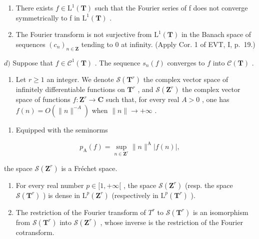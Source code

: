 \begin{enumerate}
\def\labelenumi{\alph{enumi})}
\setcounter{enumi}{1}
\item
  There exists \(f \in \mathrm{L}^{1}(\mathbf{T})\) such that the Fourier series of f does not converge symmetrically to f in \(\mathrm{L}^{1}(\mathbf{T})\) .
\item
  The Fourier transform is not surjective from \(\mathrm{L}^{1}(\mathbf{T})\) in the Banach space of sequences \((c_{n})_{n\in\mathbf{Z}}\) tending to 0 at infinity. (Apply Cor. 1 of EVT, I, p.~19.)
\end{enumerate}

\(d)\) Suppose that \(f \in \mathcal{C}^1(\mathbf{T})\) . The sequence \(s_n(f)\) converges to \(f\) into \(\mathcal{C}(\mathbf{T})\) .

\begin{enumerate}
\def\labelenumi{\arabic{enumi})}
\setcounter{enumi}{30}
\tightlist
\item
  Let \(r \geqslant 1\) an integer. We denote \(\mathcal{S}(\mathbf{T}^r)\) the complex vector space of infinitely differentiable functions on \(\mathbf{T}^r\) , and \(\mathcal{S}(\mathbf{Z}^r)\) the complex vector space of functions \(f\colon \mathbf{Z}^r \to \mathbf{C}\) such that, for every real \(A > 0\) , one has \(f(n) = O(\|n\|^{-A})\) when \(\|n\| \to +\infty\) .
\end{enumerate}

\begin{enumerate}
\def\labelenumi{\alph{enumi})}
\tightlist
\item
  Equipped with the seminorms
\end{enumerate}

\[
p _ {\mathrm{A}} (f) = \sup _ {n \in \mathbf {Z} ^ {r}} \| n \| ^ {\mathrm{A}} | f (n) |,
\]

the space \(\mathcal{S}(\mathbf{Z}^{r})\) is a Fréchet space.

\begin{enumerate}
\def\labelenumi{\alph{enumi})}
\setcounter{enumi}{1}
\item
  For every real number \(p \in [1, +\infty[\) , the space \(\mathcal{S}(\mathbf{Z}^{r})\) (resp. the space \(\mathcal{S}(\mathbf{T}^{r})\) ) is dense in \(\mathrm{L}^{p}(\mathbf{Z}^{r})\) (respectively in \(\mathrm{L}^{p}(\mathbf{T}^{r})\) ).
\item
  The restriction of the Fourier transform of \(T^{r}\) to \(\mathcal{S}(\mathbf{T}^{r})\) is an isomorphism from \(\mathcal{S}(\mathbf{T}^{r})\) into \(\mathcal{S}(\mathbf{Z}^{r})\) , whose inverse is the restriction of the Fourier cotransform.
\end{enumerate}


